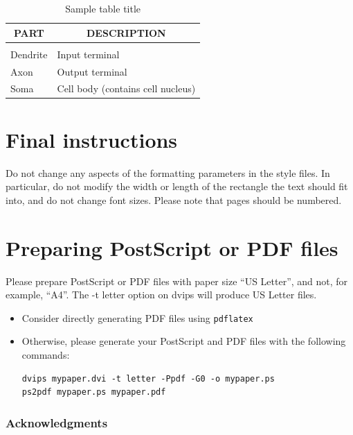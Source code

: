 \documentclass{article} %
\begin{document}
\begin{table}[t]
\caption{Sample table title}
\label{sample-table}
\begin{center}
\begin{tabular}{ll}
\multicolumn{1}{c}{\bf PART}  &\multicolumn{1}{c}{\bf DESCRIPTION}
\\ \hline \\
Dendrite         &Input terminal \\
Axon             &Output terminal \\
Soma             &Cell body (contains cell nucleus) \\
\end{tabular}
\end{center}
\end{table}

\section{Final instructions}
Do not change any aspects of the formatting parameters in the style
files.  In particular, do not modify the width or length of the
rectangle the text should fit into, and do not change font sizes.
Please note that pages should be numbered.

\section{Preparing PostScript or PDF files}

Please prepare PostScript or PDF files with paper size ``US Letter'', and
not, for example, ``A4''. The -t
letter option on dvips will produce US Letter files.

\begin{itemize}

\item Consider directly generating PDF files using \verb+pdflatex+

\item Otherwise, please generate your PostScript and PDF files with the following commands:
\begin{verbatim}
dvips mypaper.dvi -t letter -Ppdf -G0 -o mypaper.ps
ps2pdf mypaper.ps mypaper.pdf
\end{verbatim}
\end{itemize}


\subsubsection*{Acknowledgments}
\end{document}
